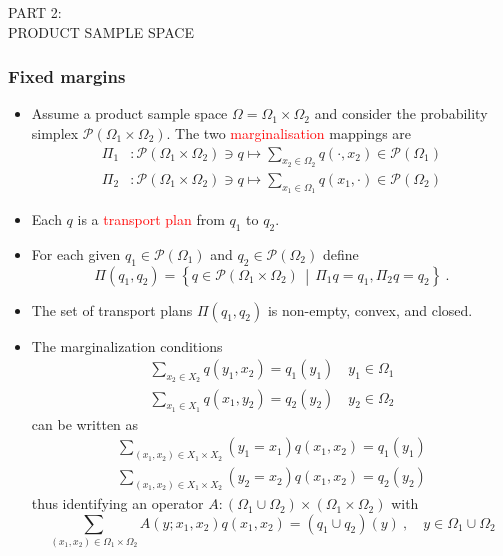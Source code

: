 \documentclass[xcolor=svgnames]{beamer}
\newcommand{\rosso}[1]{\textcolor{red}{#1}}
\newcommand{\setof}[2]{\left\{#1 \, \middle| \, #2 \right\}}
\newcommand{\simplexon}[1]{\mathcal P\left(#1\right)}
\renewcommand{\emph}{\rosso}
\begin{document}
\begin{frame}[plain]

    \huge PART 2: \\
    PRODUCT SAMPLE SPACE
    
\end{frame}



\begin{frame}\small\frametitle{Fixed margins}
\begin{itemize}
    \item Assume a product sample space $\Omega = \Omega_1 \times \Omega_2$ and consider the probability simplex $\simplexon{\Omega_1 \times \Omega_2}$. The two \emph{marginalisation} mappings are
    \begin{align*}
 \Pi_1& \colon \simplexon{\Omega_1 \times \Omega_2} \ni q \mapsto \sum_{x_2 \in \Omega_2} q(\cdot,x_2) \in  \simplexon{\Omega_1}  \\
 \Pi_2& \colon \simplexon{\Omega_1 \times \Omega_2} \ni q \mapsto \sum_{x_1 \in \Omega_1} q(x_1,\cdot) \in  \simplexon{\Omega_2} 
    \end{align*}
    \item Each $q$ is a \emph{transport plan} from $q_1$ to $q_2$.
    \item For each given $q_1 \in \simplexon{\Omega_1}$ and $q_2 \in \simplexon{\Omega_2}$ define 
    \begin{equation*}
        \Pi(q_1,q_2) = \setof{q \in \simplexon{\Omega_1 \times \Omega_2}} {\Pi_1 q = q_1, \Pi_2 q = q_2} \ .
    \end{equation*}
    \item The set of transport plans  $\Pi(q_1,q_2)$ is non-empty, convex, and closed.
      \item The marginalization conditions
    \begin{gather*}
        \sum_{x_2 \in X_2} q(y_1,x_2) = q_1(y_1) \quad y_1 \in \Omega_1 \\
            \sum_{x_1 \in X_1} q(x_1,y_2) = q_2(y_2) \quad y_2 \in \Omega_2
    \end{gather*}
    can be written as
    \begin{gather*}
        \sum_{(x_1,x_2) \in X_1\times X_2} (y_1 = x_1) q(x_1,x_2) = q_1(y_1) \\
             \sum_{(x_1,x_2) \in X_1\times X_2} (y_2 = x_2) q(x_1,x_2) = q_2(y_2)
    \end{gather*}
    thus identifying an operator $A \colon (\Omega_1 \cup \Omega_2) \times (\Omega_1 \times \Omega_2)$ with
    \begin{equation*}
     \sum_{(x_1,x_2) \in \Omega_1 \times \Omega_2} A(y;x_1,x_2) q(x_1,x_2) = (q_1 \cup q_2)(y) \ , \quad y \in \Omega_1 \cup \Omega_2 
    \end{equation*}
\end{itemize}    
\end{frame}
\end{document}
